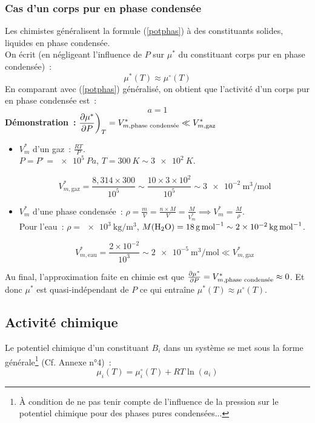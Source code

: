 \documentclass{article}
\let\oldref\ref
\renewcommand{\ref}[1]{(\oldref{#1})}
\newcommand{\ds}{\displaystyle}
\begin{document}
\subsubsection{Cas d'un corps pur en phase condensée}
\begin{tableau}
    Les chimistes généralisent la formule \ref{potphas} à des constituants solides, liquides en phase condensée.\\
    On écrit (en négligeant l'influence de $P$ sur $\mu^*$ du constituant corps pur en phase condensée)~:
    $$\mu^*(T) \approx \mu^\circ(T)$$
    En comparant avec \ref{potphas} généralisé, on obtient que l'activité d'un corps pur en phase condensée est~:
    $$a=1$$
    \tcbline
    \textbf{Démonstration~:} $\ds\pdv{\mu^*}{P}\bigg)_T = V_{m,\text{phase condensée}}^* \ll V_{m,\text{gaz}}^*$
    \begin{itemize}
        \item $V_m^*$ d'un gaz~: $\frac{RT}{P}$.\\
        $P=P^\circ = \SI{e5}{Pa}$, $T=\SI{300}{K}\sim \SI{3e2}{K}$.
        \begin{appnum}
        $$V_{m,\text{gaz}}^* = \frac{8,314\times 300}{10^5} \sim \frac{10\times 3\times 10^2}{10^5} \sim \SI{3e-2}{\cubic\meter\per\mole}$$
        \end{appnum}
        \item $V_m^*$ d'une phase condensée~: $\rho = \frac{m}{V} = \frac{n\times M}{V} = \frac{M}{V_m^*} \implies V_m^* = \frac{M}{\rho}$.\\
        Pour l'eau~: $\rho = \SI{e3}{\kilo\gram\per\cubic\meter}$, $M(\ce{H2O}) = \SI{18}{\gram\per\mol} \sim \SI{2e-2}{\kilo\gram\per\mole}$.
        \begin{appnum}
        $$V_{m,\text{eau}}^* = \frac{2\times 10^{-2}}{10^3} \sim \SI{2e-5}{\cubic\meter\per\mole} \ll V^*_{m,\text{gaz}}$$
        \end{appnum}
    \end{itemize}
    Au final, l'approximation faite en chimie est que $\pdv{\mu^*}{P}=V_{m,\text{phase condensée}}^* \approx 0$. Et donc $\mu^*$ est quasi-indépendant de $P$ ce qui entraîne $\mu^*(T) \approx \mu^\circ(T)$.
\end{tableau}
\subsection{Activité chimique}
Le potentiel chimique d'un constituant $B_i$ dans un système se met sous la forme générale\footnote{À condition de ne pas tenir compte de l'influence de la pression sur le potentiel chimique pour des phases pures condensées...}  (Cf. \textsf{Annexe n°4})~:
$$\mu_i(T) = \mu_i^\circ(T) + RT\ln(a_i)$$
\end{document}
